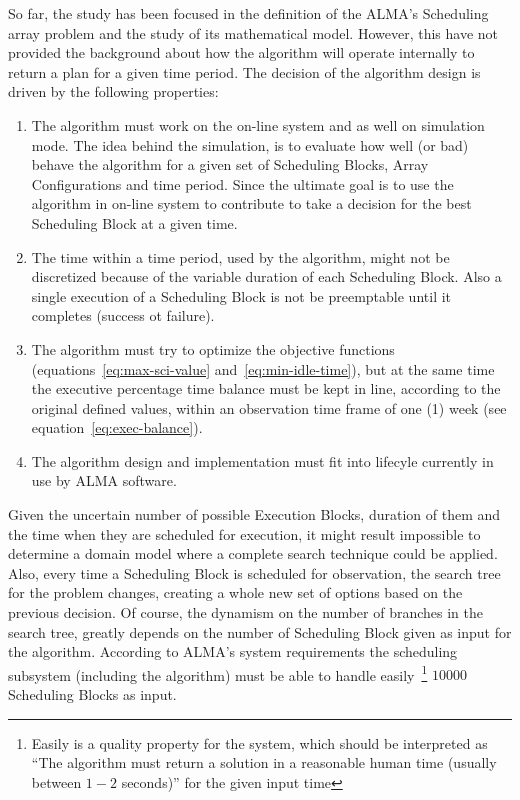 So far, the study has been focused in the definition of the ALMA's Scheduling array problem and the study of its mathematical model. However, this have not provided the background about how the algorithm will operate internally to return a plan for a given time period. The decision of the algorithm design is driven by the following properties:
\begin{enumerate}
\item The algorithm must work on the on-line system and as well on simulation mode. The idea behind the simulation, is to evaluate how well (or bad) behave the algorithm for a given set of Scheduling Blocks, Array Configurations and time period. Since the ultimate goal is to use the algorithm in on-line system to contribute to take a decision for the best Scheduling Block at a given time.

\item The time within a time period, used by the algorithm, might not be discretized because of the variable duration of each Scheduling Block. Also a single execution of a Scheduling Block is not be preemptable until it completes (success ot failure). 

\item The algorithm must try to optimize the objective functions (equations~\ref{eq:max-sci-value} and~\ref{eq:min-idle-time}), but at the same time the executive percentage time balance must be kept in line, according to the original defined values, within an observation time frame of one (1) week (see equation~\ref{eq:exec-balance}).

\item The algorithm design and implementation must fit into lifecyle currently in use by ALMA software.

\end{enumerate}

Given the uncertain number of possible Execution Blocks, duration of them and the time when they are scheduled for execution, it might result impossible to determine a domain model where a complete search technique could be applied. Also, every time a Scheduling Block is scheduled for observation, the search tree for the problem changes, creating a whole new set of options based on the previous decision. Of course, the dynamism on the number of branches in the search tree, greatly depends on the number of Scheduling Block given as input for the algorithm. According to ALMA's system requirements the scheduling subsystem (including the algorithm) must be able to handle easily~\footnote{Easily is a quality property for the system, which should be interpreted as ``The algorithm must return a solution in a reasonable human time (usually between $1-2$ seconds)'' for the given input time} $10000$ Scheduling Blocks as input.

